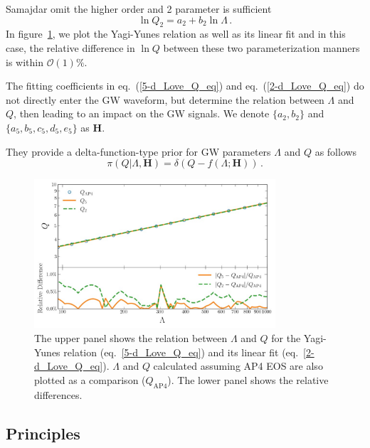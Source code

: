 \documentclass[a4paper,11pt]{article}
\begin{document}
Samajdar omit the higher order and 2 parameter is sufficient
\begin{equation}
\label{2-d_Love_Q_eq}
    \ln Q_{2} = a_2 + b_2 \ln \Lambda\,.
\end{equation}
In figure~\ref{relative_difference}, we plot the Yagi-Yunes relation as well as its linear fit and in this case, the relative difference in $\ln Q$ between these two parameterization manners is within $\mathcal{O}(1) \%$. 


The fitting coefficients in eq.~(\ref{5-d_Love_Q_eq}) and eq.~(\ref{2-d_Love_Q_eq}) do not directly enter the GW waveform, but determine the relation between $\Lambda$ and $Q$, then leading to an impact on the GW signals. We denote $\{a_2, b_2\}$ and $\{a_5, b_5, c_5, d_5, e_5\}$ as $\bm{H}$.

They provide a delta-function-type prior for GW parameters $\Lambda$ and $Q$ as follows
\begin{equation}
\label{delta function prior}
\pi(Q|\Lambda,\bm{H}) = \delta(Q-f(\Lambda;\bm{H}))\,.
\end{equation}

\begin{figure}[tbp]
\centering
\includegraphics[width=0.8\textwidth]{2d-5d difference.pdf}%
\caption{\label{relative_difference} The upper panel shows the relation between $\Lambda$ and $Q$ for the Yagi-Yunes relation (eq.~\ref{5-d_Love_Q_eq}) and its linear fit (eq.~\ref{2-d_Love_Q_eq}). $\Lambda$ and $Q$ calculated assuming AP4 EOS are also plotted as a comparison ($Q_{\mathrm{AP4}}$). The lower panel shows the relative differences.}
\end{figure}

\subsection{Principles}
\label{sec2_2}
\end{document}
